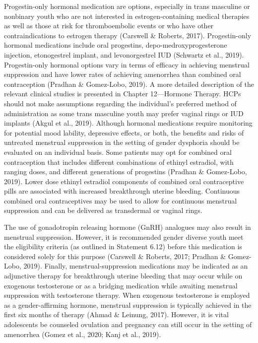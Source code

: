 \documentclass[
]{book}
\begin{document}
Progestin-only hormonal medication are
options, especially in trans masculine or nonbinary youth who are not interested in
estrogen-containing medical therapies as well as
those at risk for thromboembolic events or who
have other contraindications to estrogen therapy
(Carswell \& Roberts, 2017). Progestin-only hormonal medications include oral progestins,
depo-medroxyprogesterone injection, etonogestrel
implant, and levonorgestrel IUD (Schwartz et al.,
2019). Progestin-only hormonal options vary in
terms of efficacy in achieving menstrual suppression and have lower rates of achieving amenorrhea than combined oral contraception (Pradhan
\& Gomez-Lobo, 2019). A more detailed description of the relevant clinical studies is presented
in Chapter 12---Hormone Therapy. HCPs should
not make assumptions regarding the individual's
preferred method of administration as some trans
masculine youth may prefer vaginal rings or IUD
implants (Akgul et al., 2019). Although hormonal
medications require monitoring for potential
mood lability, depressive effects, or both, the benefits and risks of untreated menstrual suppression
in the setting of gender dysphoria should be evaluated on an individual basis. Some patients may
opt for combined oral contraception that includes
different combinations of ethinyl estradiol, with
ranging doses, and different generations of progestins (Pradhan \& Gomez-Lobo, 2019). Lower
dose ethinyl estradiol components of combined
oral contraceptive pills are associated with
increased breakthrough uterine bleeding.
Continuous combined oral contraceptives may be
used to allow for continuous menstrual suppression and can be delivered as transdermal or vaginal rings.

The use of gonadotropin releasing hormone
(GnRH) analogues may also result in menstrual
suppression. However, it is recommended gender
diverse youth meet the eligibility criteria (as outlined in Statement 6.12) before this medication
is considered solely for this purpose (Carswell \&
Roberts, 2017; Pradhan \& Gomez-Lobo, 2019).
Finally, menstrual-suppression medications may
be indicated as an adjunctive therapy for breakthrough uterine bleeding that may occur while
on exogenous testosterone or as a bridging medication while awaiting menstrual suppression with
testosterone therapy. When exogenous testosterone is employed as a gender-affirming hormone,
menstrual suppression is typically achieved in the
first six months of therapy (Ahmad \& Leinung,
2017). However, it is vital adolescents be counseled ovulation and pregnancy can still occur in
the setting of amenorrhea (Gomez et al., 2020;
Kanj et al., 2019).
\end{document}
